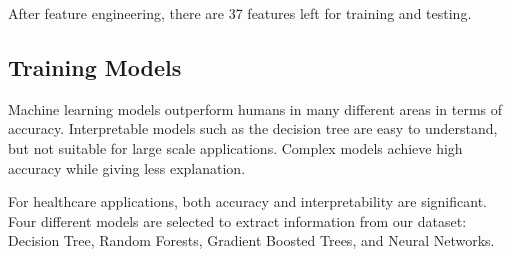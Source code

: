 \par
After feature engineering, there are 37 features left for training and testing.

\subsection{Training Models}

Machine learning models outperform humans in many different areas in terms of accuracy. Interpretable models such as the decision tree are easy to understand, but not suitable for large scale applications. Complex models achieve high accuracy while giving less explanation. 

For healthcare applications, both accuracy and interpretability are significant. Four different models are selected to extract information from our dataset: Decision Tree, Random Forests, Gradient Boosted Trees, and Neural Networks.

